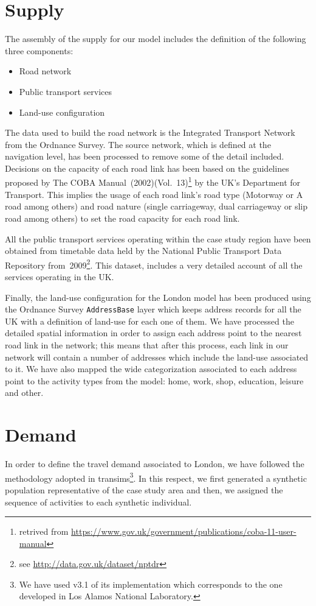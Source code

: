 \section{Supply}
The assembly of the supply for our model includes the definition of the following three components:
%
\begin{itemize}\styleItemize
\item	Road network
\item	Public transport services
\item	Land-use configuration
\end{itemize}
%
The data used to build the road network is the Integrated Transport Network from the Ordnance Survey. 
The source network, which is defined at the navigation level, has been processed to remove some of the detail included. 
Decisions on the capacity of each road link has been based on the guidelines proposed by The COBA Manual~(2002)(Vol.~13)\footnote{retrived from \url{https://www.gov.uk/government/publications/coba-11-user-manual}} by the UK’s Department for Transport. 
This implies the usage of each road link’s road type (Motorway or A road among others) and road nature (single carriageway, dual carriageway or slip road among others) to set the road capacity for each road link.

All the public transport services operating within the case study region have been obtained from timetable data held by the National Public Transport Data Repository from~2009\footnote{see \url{http://data.gov.uk/dataset/nptdr}}. 
This dataset, includes a very detailed account of all the services operating in the UK.

Finally, the land-use configuration for the London model has been produced using the Ordnance Survey \lstinline|AddressBase| layer which keeps address records for all the UK with a definition of land-use for each one of them. 
We have processed the detailed spatial information in order to assign each address point to the nearest road link in the network; this means that after this process, each link in our network will contain a number of addresses which include the land-use associated to it. 
We have also mapped the wide categorization associated to each address point to the activity types from the model: home, work, shop, education, leisure and other.

\section{Demand}
In order to define the travel demand associated to London, we have followed the methodology adopted in \gls{transims}\footnote{We have used v3.1 of its implementation which corresponds to the one developed in Los Alamos National Laboratory.}. In this respect, we first generated a synthetic population representative of the case study area and then, we assigned the sequence of activities to each synthetic individual.

